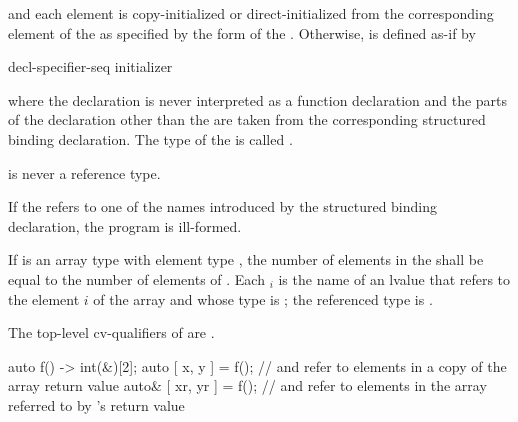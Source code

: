 and each element is copy-initialized or direct-initialized
from the corresponding element of the  as specified
by the form of the .
Otherwise, 
is defined as-if by

\begin{ncbnf}
 decl-specifier-seq   initializer \terminal{;}
\end{ncbnf}

where
the declaration is never interpreted as a function declaration and
the parts of the declaration other than the  are taken
from the corresponding structured binding declaration.
The type of the 
 is called .
\begin{note}
 is never a reference type.
\end{note}

\pnum
If the  refers to
one of the names introduced by the structured binding declaration,
the program is ill-formed.

\pnum
If  is an array type with element type , the number
of elements in the  shall be equal to the
number of elements of . Each $_i$ is the name of an
lvalue that refers to the element $i$ of the array and whose type
is ; the referenced type is .
\begin{note}
The top-level cv-qualifiers of  are \cv.
\end{note}
\begin{example}
\begin{codeblock}
  auto f() -> int(&)[2];
  auto [ x, y ] = f();          //  and  refer to elements in a copy of the array return value
  auto& [ xr, yr ] = f();       //  and  refer to elements in the array referred to by 's return value
\end{codeblock}
\end{example}

